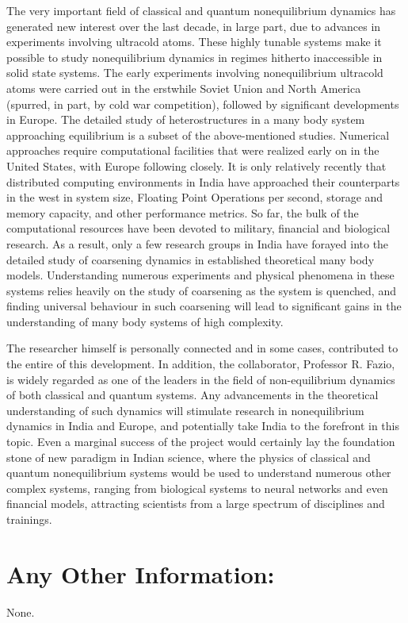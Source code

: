 \documentclass[a4paper,11pt,color]{article}
\begin{document}
The very important field of classical and quantum nonequilibrium dynamics has generated new interest over the last decade, in large part, due to advances in experiments involving ultracold atoms. These highly tunable systems make it possible to study nonequilibrium dynamics in regimes hitherto inaccessible in solid state systems. The early experiments involving nonequilibrium ultracold atoms were carried out in the erstwhile Soviet Union and North America (spurred, in part, by cold war competition), followed by significant developments in Europe. The detailed study of heterostructures in a many body system approaching equilibrium is a subset of the above-mentioned studies. Numerical approaches require computational facilities that were realized early on in the United States, with Europe following closely. It is only relatively recently that distributed computing environments in India have approached their counterparts in the west in system size, Floating Point Operations per second, storage and 
memory capacity, and other performance metrics. So far, the bulk of the computational resources have been devoted to military, financial and biological research. As a result, only a few research groups in India have forayed into the detailed study of coarsening dynamics in established theoretical many body models. Understanding numerous experiments and physical phenomena in these systems relies heavily on the study of coarsening as the system is quenched, and finding universal behaviour in such coarsening will lead to significant gains in the understanding of many body systems of high complexity.

The researcher himself is personally connected and in some cases, contributed to the entire of this development. In addition, the collaborator, Professor R. Fazio, is widely regarded as  one of the leaders in the field of non-equilibrium dynamics of both classical and quantum systems. Any advancements in the theoretical understanding of such dynamics will stimulate research in nonequilibrium dynamics in India and Europe, and potentially take India to the forefront in this topic. Even a marginal success of the project would certainly lay the foundation stone of new paradigm in Indian science, where the physics of classical and quantum nonequilibrium systems would be used to understand numerous other complex systems, ranging from biological systems to neural networks and even financial models, attracting scientists from a large spectrum of disciplines and trainings.

\section{Any Other Information:}
None.\\
\end{document}
